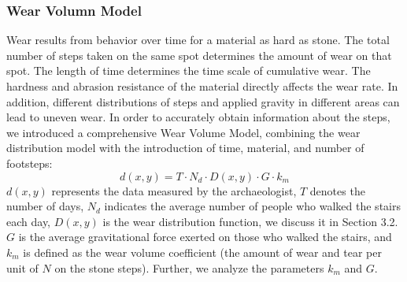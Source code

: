\documentclass[12pt]{article}  %
\numberwithin{equation}{section} %
\begin{document}
\subsubsection{Wear Volumn Model}
Wear results from behavior over time for a material as hard as stone. The total number of steps taken on the same spot determines the amount of wear on that spot. The length of time determines the time scale of cumulative wear. The hardness and abrasion resistance of the material directly affects the wear rate. In addition, different distributions of steps and applied gravity in different areas can lead to uneven wear. In order to accurately obtain information about the steps, we introduced a comprehensive Wear Volume Model, combining the wear distribution model with the introduction of time, material, and number of footsteps:
\begin{equation}
    d(x,y) = T\cdot{N_d}\cdot{D(x,y)}\cdot{G}\cdot{k_m}
\end{equation}
\label{equation3.2}
$d(x,y)$ represents the data measured by the archaeologist, $T$ denotes the number of days, $N_d$ indicates the average number of people who walked the stairs each day, $D(x,y)$ is the wear distribution function, we discuss it in Section 3.2. $G$ is the average gravitational force exerted on those who walked the stairs, and $k_m$ is defined as the wear volume coefficient (the amount of wear and tear per unit of $N$ on the stone steps). Further, we analyze the parameters $k_m$ and $G$.
\end{document}

